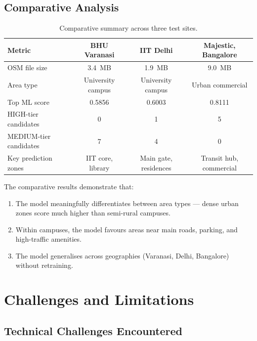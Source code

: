 \documentclass[12pt, a4paper]{article}
\begin{document}
\subsection{Comparative Analysis}

\begin{table}[H]
\centering
\caption{Comparative summary across three test sites.}
\label{tab:comparison}
\begin{tabular}{@{}lccc@{}}
\toprule
\textbf{Metric} & \textbf{BHU Varanasi} & \textbf{IIT Delhi} & \textbf{Majestic, Bangalore} \\
\midrule
OSM file size & 3.4~MB & 1.9~MB & 9.0~MB \\
Area type & University campus & University campus & Urban commercial \\
Top ML score & 0.5856 & 0.6003 & 0.8111 \\
HIGH-tier candidates & 0 & 1 & 5 \\
MEDIUM-tier candidates & 7 & 4 & 0 \\
Key prediction zones & IIT core, library & Main gate, residences & Transit hub, commercial \\
\bottomrule
\end{tabular}
\end{table}

The comparative results demonstrate that:
\begin{enumerate}
    \item The model meaningfully differentiates between area types — 
    dense urban zones score much higher than semi-rural campuses.
    \item Within campuses, the model favours areas near main roads, 
    parking, and high-traffic amenities.
    \item The model generalises across geographies (Varanasi, Delhi, 
    Bangalore) without retraining.
\end{enumerate}


\section{Challenges and Limitations}

\subsection{Technical Challenges Encountered}
\end{document}
